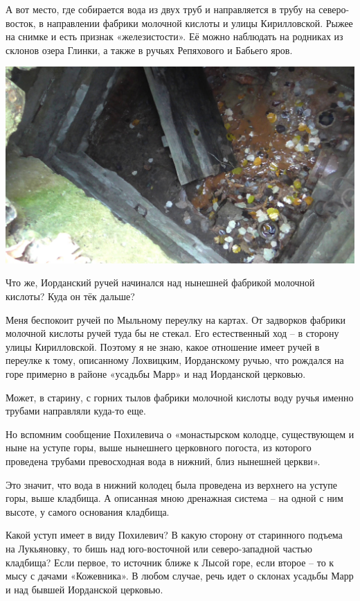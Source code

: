 А вот место, где собирается вода из двух труб и направляется в трубу на северо-восток, в направлении фабрики молочной кислоты и улицы Кирилловской. Рыжее на снимке и есть признак «железистости». Её можно наблюдать на родниках из склонов озера Глинки, а также в ручьях Репяхового и Бабьего яров.

\begin{center}
\includegraphics[width=\linewidth]{chast-kirvys/iordanruch/s_vlcsnap-2014-05-16-20h10m19s241.jpg}
\end{center}

Что же, Иорданский ручей начинался над нынешней фабрикой молочной кислоты? Куда он тёк дальше?

Меня беспокоит ручей по Мыльному переулку на картах. От задворков фабрики молочной кислоты ручей туда бы не стекал. Его естественный ход – в сторону улицы Кирилловской. Поэтому я не знаю, какое отношение имеет ручей в переулке к тому, описанному Лохвицким, Иорданскому ручью, что рождался на горе примерно в районе «усадьбы Марр» и над Иорданской церковью. 

Может, в старину, с горних тылов фабрики молочной кислоты воду ручья именно трубами направляли куда-то еще. 

Но вспомним сообщение Похилевича о «монастырском колодце, существующем и ныне на уступе горы, выше нынешнего церковного погоста, из которого проведена трубами превосходная вода в нижний, близ нынешней церкви».

Это значит, что вода в нижний колодец была проведена из верхнего на уступе горы, выше кладбища. А описанная мною дренажная система – на одной с ним высоте, у самого основания кладбища.

Какой уступ имеет в виду Похилевич? В какую сторону от старинного подъема на Лукьяновку, то бишь над юго-восточной или северо-западной частью кладбища? Если первое, то источник ближе к Лысой горе, если второе – то к мысу с дачами «Кожевника». В любом случае, речь идет о склонах усадьбы Марр и над бывшей Иорданской церковью. 

